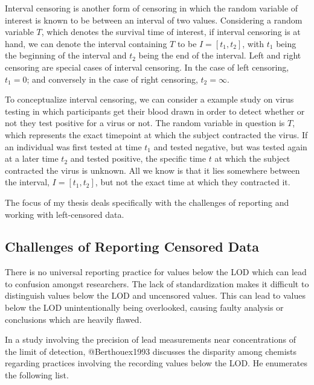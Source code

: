 \documentclass[
]{article}
\begin{document}
Interval censoring is another form of censoring in which the random
variable of interest is known to be between an interval of two values.
Considering a random variable \(T\), which denotes the survival time of
interest, if interval censoring is at hand, we can denote the interval
containing \(T\) to be \(I = [t_1, t_2]\), with \(t_1\) being the
beginning of the interval and \(t_2\) being the end of the interval.
Left and right censoring are special cases of interval censoring. In the
case of left censoring, \(t_1 = 0\); and conversely in the case of right
censoring, \(t_2 = \infty\).

To conceptualize interval censoring, we can consider a example study on
virus testing in which participants get their blood drawn in order to
detect whether or not they test positive for a virus or not. The random
variable in question is \(T\), which represents the exact timepoint at
which the subject contracted the virus. If an individual was first
tested at time \(t_1\) and tested negative, but was tested again at a
later time \(t_2\) and tested positive, the specific time \(t\) at which
the subject contracted the virus is unknown. All we know is that it lies
somewhere between the interval, \(I = [t_1, t_2]\), but not the exact
time at which they contracted it.

The focus of my thesis deals specifically with the challenges of
reporting and working with left-censored data.

\hypertarget{challenges}{%
\subsection{Challenges of Reporting Censored Data}\label{challenges}}

There is no universal reporting practice for values below the LOD which
can lead to confusion amongst researchers. The lack of standardization
makes it difficult to distinguish values below the LOD and uncensored
values. This can lead to values below the LOD unintentionally being
overlooked, causing faulty analysis or conclusions which are heavily
flawed.

In a study involving the precision of lead measurements near
concentrations of the limit of detection, @Berthouex1993 discusses the
disparity among chemists regarding practices involving the recording
values below the LOD. He enumerates the following list.
\end{document}
